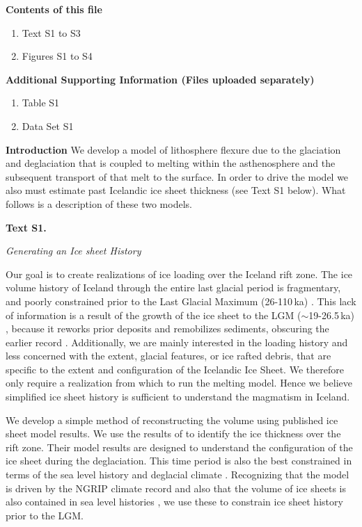 \documentclass[draft,grl]{agutexSI2018}
\begin{document}
\begin{article}

\noindent\textbf{Contents of this file}
\begin{enumerate}
\item Text S1 to S3
\item Figures S1 to S4
\end{enumerate}
\noindent\textbf{Additional Supporting Information (Files uploaded separately)}
\begin{enumerate}
\item Table S1
\item Data Set S1
\end{enumerate}

\clearpage

\noindent\textbf{Introduction}
We develop a model of lithosphere flexure due to the glaciation and deglaciation that is coupled to melting within the asthenosphere and the subsequent transport of that melt to the surface. In order to drive the model we also must estimate past Icelandic ice sheet thickness (see Text S1 below). What follows is a description of these two models.

\noindent\textbf{Text S1.}

\noindent\textit{Generating an Ice sheet History}

Our goal is to create realizations of ice loading over the Iceland rift zone. The ice volume history of Iceland through the entire last glacial period is fragmentary, and poorly constrained prior to the Last Glacial Maximum (26-110\,ka) \citep{geirsdottir-2011}.  This lack of information is a result of the growth of the ice sheet to the LGM ($\sim$19-26.5\,ka) \citep{geirsdottir-2011,clark-etal-2009}, because it reworks prior deposits and remobilizes sediments, obscuring the earlier record \citep{andrews-2008}. Additionally, we are mainly interested in the loading history and less concerned with the extent, glacial features, or ice rafted debris, that are specific to the extent and configuration of the Icelandic Ice Sheet. We therefore only require a realization from which to run the melting model. Hence we believe simplified ice sheet history is sufficient to understand the magmatism in Iceland. 

We develop a simple method of reconstructing the volume using published ice sheet model results. We use the results of \citet{patton-etal-2017} to identify the ice thickness over the rift zone. Their model results are designed to understand the configuration of the ice sheet during the deglaciation. This time period is also the best constrained in terms of the sea level history \citep{spratt-2016,andersen-etal-2004} and deglacial climate \citep{lambeck-2001}. Recognizing that the \citet{patton-etal-2017} model is driven by the NGRIP climate record \citep{lambeck-2001} and also that the volume of ice sheets is also contained in sea level histories \citep{spratt-2016}, we use these to constrain ice sheet history prior to the LGM.


\end{article}
\end{document}
